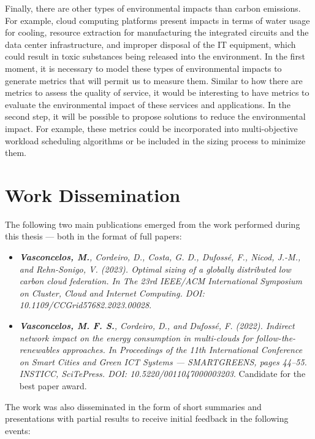 Finally, there are other types of environmental impacts than carbon emissions. For example, cloud computing platforms present impacts in terms of water usage for cooling, resource extraction for manufacturing the integrated circuits and the data center infrastructure, and improper disposal of the IT equipment, which could result in toxic substances being released into the environment. In the first moment, it is necessary to model these types of environmental impacts to generate metrics that will permit us to measure them. Similar to how there are metrics to assess the quality of service, it would be interesting to have metrics to evaluate the environmental impact of these services and applications. In the second step, it will be possible to propose solutions to reduce the environmental impact. For example, these metrics could be incorporated into multi-objective workload scheduling algorithms or be included in the sizing process to minimize them.

\section{Work Dissemination}

\label{sec:conclusion_dissemination}

The following two main publications emerged from the work performed during this thesis --- both in the format of full papers:

\begin{itemize}

\item  \textit{\textbf{Vasconcelos, M.}, Cordeiro, D., Costa, G. D., Dufossé, F., Nicod, J.-M., and Rehn-Sonigo, V. (2023). Optimal sizing of a globally distributed low carbon cloud federation. In The 23rd IEEE/ACM International Symposium on Cluster, Cloud and Internet Computing. DOI: 10.1109/CCGrid57682.2023.00028}.
  
\item  \textit{\textbf{Vasconcelos, M. F. S.}, Cordeiro, D., and Dufossé, F. (2022). Indirect network impact on the energy consumption in multi-clouds for follow-the-renewables approaches. In Proceedings of the 11th International Conference on Smart Cities and Green ICT Systems — SMARTGREENS, pages 44–55. INSTICC, SciTePress. DOI: 10.5220/0011047000003203}. Candidate for the best paper award.

\end{itemize}

The work was also disseminated in the form of short summaries and presentations with partial results to receive initial feedback in the following events:


